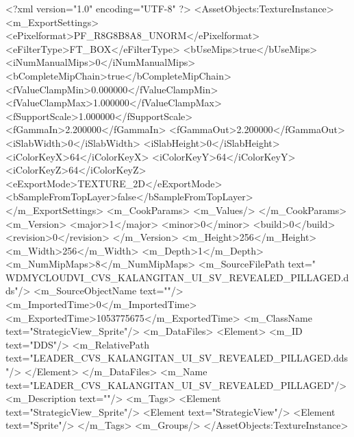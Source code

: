 <?xml version="1.0" encoding="UTF-8" ?>
<AssetObjects:TextureInstance>
	<m_ExportSettings>
		<ePixelformat>PF_R8G8B8A8_UNORM</ePixelformat>
		<eFilterType>FT_BOX</eFilterType>
		<bUseMips>true</bUseMips>
		<iNumManualMips>0</iNumManualMips>
		<bCompleteMipChain>true</bCompleteMipChain>
		<fValueClampMin>0.000000</fValueClampMin>
		<fValueClampMax>1.000000</fValueClampMax>
		<fSupportScale>1.000000</fSupportScale>
		<fGammaIn>2.200000</fGammaIn>
		<fGammaOut>2.200000</fGammaOut>
		<iSlabWidth>0</iSlabWidth>
		<iSlabHeight>0</iSlabHeight>
		<iColorKeyX>64</iColorKeyX>
		<iColorKeyY>64</iColorKeyY>
		<iColorKeyZ>64</iColorKeyZ>
		<eExportMode>TEXTURE_2D</eExportMode>
		<bSampleFromTopLayer>false</bSampleFromTopLayer>
	</m_ExportSettings>
	<m_CookParams>
		<m_Values/>
	</m_CookParams>
	<m_Version>
		<major>1</major>
		<minor>0</minor>
		<build>0</build>
		<revision>0</revision>
	</m_Version>
	<m_Height>256</m_Height>
	<m_Width>256</m_Width>
	<m_Depth>1</m_Depth>
	<m_NumMipMaps>8</m_NumMipMaps>
	<m_SourceFilePath text="\\WDMYCLOUD\Sam\Projects\Modding\Civ VI\Civilizations\Philippines\Kalangitan\DDS\LEADER_CVS_KALANGITAN_UI_SV_REVEALED_PILLAGED.dds"/>
	<m_SourceObjectName text=""/>
	<m_ImportedTime>0</m_ImportedTime>
	<m_ExportedTime>1053775675</m_ExportedTime>
	<m_ClassName text="StrategicView_Sprite"/>
	<m_DataFiles>
		<Element>
			<m_ID text="DDS"/>
			<m_RelativePath text="LEADER_CVS_KALANGITAN_UI_SV_REVEALED_PILLAGED.dds"/>
		</Element>
	</m_DataFiles>
	<m_Name text="LEADER_CVS_KALANGITAN_UI_SV_REVEALED_PILLAGED"/>
	<m_Description text=""/>
	<m_Tags>
		<Element text="StrategicView_Sprite"/>
		<Element text="StrategicView"/>
		<Element text="Sprite"/>
	</m_Tags>
	<m_Groups/>
</AssetObjects:TextureInstance>

 